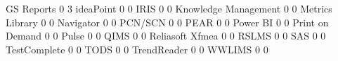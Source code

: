 \documentclass{article}
\begin{document}
\begin{Schunk}
\begin{Soutput}
  GS Reports                                              0                  3
  ideaPoint                                               0                  0
  IRIS                                                    0                  0
  Knowledge Management                                    0                  0
  Metrics Library                                         0                  0
  Navigator                                               0                  0
  PCN/SCN                                                 0                  0
  PEAR                                                    0                  0
  Power BI                                                0                  0
  Print on Demand                                         0                  0
  Pulse                                                   0                  0
  QIMS                                                    0                  0
  Reliasoft Xfmea                                         0                  0
  RSLMS                                                   0                  0
  SAS                                                     0                  0
  TestComplete                                            0                  0
  TODS                                                    0                  0
  TrendReader                                             0                  0
  WWLIMS                                                  0                  0
                                          

\end{Soutput}
\end{Schunk}
\end{document}
